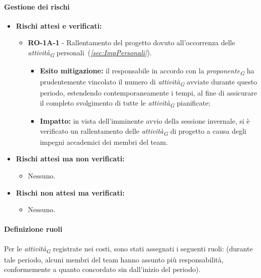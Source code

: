 \paragraph{Gestione dei rischi} 
\begin{itemize}
    \item \textbf{Rischi attesi e verificati:}
\begin{itemize}
    \item \textbf{RO-1A-1} - Rallentamento del progetto dovuto all'occorrenza delle \textit{attività}\textsubscript{\textit{G}} personali~(\textit{\ref{sec:ImpPersonali}}).
    \begin{itemize}
        \item \textbf{Esito mitigazione:}
            il responsabile in accordo con la \textit{proponente}\textsubscript{\textit{G}} ha prudentemente vincolato il numero di \textit{attività}\textsubscript{\textit{G}} avviate durante questo periodo, estendendo contemporaneamente i tempi, al fine di assicurare il completo svolgimento di tutte le \textit{attività}\textsubscript{\textit{G}} pianificate;
        \item \textbf{Impatto:}
            in vista dell'imminente avvio della sessione invernale, si è verificato un rallentamento delle \textit{attività}\textsubscript{\textit{G}} di progetto a causa degli impegni accademici dei membri del team.
    \end{itemize}
\end{itemize}
\item \textbf{Rischi attesi ma non verificati:}
 \begin{itemize}
    \item Nessuno.
\end{itemize}
\item \textbf{Rischi non attesi ma verificati:}
\begin{itemize}
    \item Nessuno.
\end{itemize}
\end{itemize}

\paragraph{Definizione ruoli} 
Per le \textit{attività}\textsubscript{\textit{G}} registrate nei costi, sono stati assegnati i seguenti ruoli: (durante tale periodo, alcuni membri del team hanno assunto più responsabilità, conformemente a quanto concordato sin dall'inizio del periodo).

